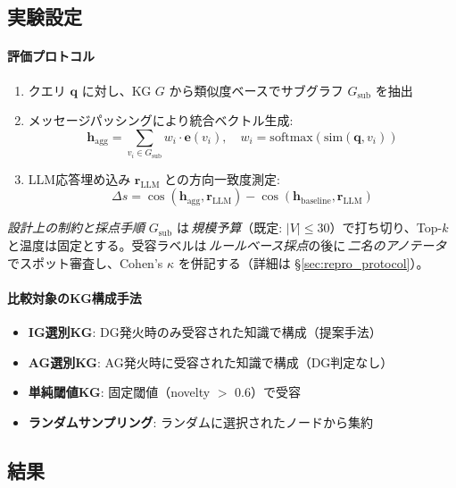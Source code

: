 \documentclass[ja=standard,xelatex]{bxjsarticle}
\begin{document}
\subsection{実験設定}

\paragraph{評価プロトコル}
\begin{enumerate}
  \item クエリ $\mathbf{q}$ に対し、KG $G$ から類似度ベースでサブグラフ $G_{\text{sub}}$ を抽出
  \item メッセージパッシングにより統合ベクトル生成:
  \begin{equation}
    \mathbf{h}_{\text{agg}} = \sum_{v_i \in G_{\text{sub}}} w_i \cdot \mathbf{e}(v_i), \quad
    w_i = \mathrm{softmax}(\mathrm{sim}(\mathbf{q}, v_i))
  \end{equation}
  \item LLM応答埋め込み $\mathbf{r}_{\text{LLM}}$ との方向一致度測定:
  \begin{equation}
    \Delta s = \cos(\mathbf{h}_{\text{agg}}, \mathbf{r}_{\text{LLM}}) - \cos(\mathbf{h}_{\text{baseline}}, \mathbf{r}_{\text{LLM}})
  \end{equation}
\end{enumerate}

\noindent\textit{設計上の制約と採点手順}\; $G_{\text{sub}}$ は\,\emph{規模予算}（既定: $|V|\le 30$）で打ち切り、Top-$k$ と温度は固定とする。受容ラベルは\,\emph{ルールベース採点}の後に\,\emph{二名のアノテータ}でスポット審査し、Cohen's $\kappa$ を併記する（詳細は \S\ref{sec:repro_protocol}）。

\paragraph{比較対象のKG構成手法}
\begin{itemize}
  \item \textbf{IG選別KG}: DG発火時のみ受容された知識で構成（提案手法）
  \item \textbf{AG選別KG}: AG発火時に受容された知識で構成（DG判定なし）
  \item \textbf{単純閾値KG}: 固定閾値（novelty $>$ 0.6）で受容
  \item \textbf{ランダムサンプリング}: ランダムに選択されたノードから集約
\end{itemize}

\subsection{結果}
\end{document}
